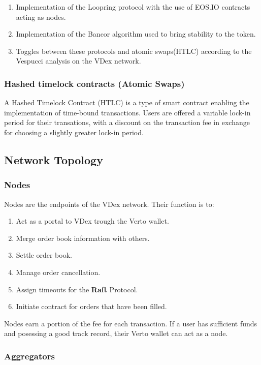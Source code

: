 \documentclass[]{article}
\begin{document}
{  
	\begin{enumerate} 
		\item Implementation of the Loopring protocol with the use of EOS.IO contracts acting as nodes.\cite{7}
		\item Implementation of the Bancor algorithm used to bring stability to the token.\cite{10}
		\item Toggles between these protocols and atomic swaps(HTLC) according to the Vespucci analysis on the VDex network.
		\end{enumerate}
	
	\subsubsection{Hashed timelock contracts (Atomic Swaps)}
	A Hashed Timelock Contract (HTLC)\cite{22} is a type of smart contract enabling the implementation of time-bound transactions.
	Users are offered a variable lock-in period for their transations, 
	with a discount on the transaction fee in exchange for choosing a slightly greater lock-in period.
	
	\subsection{Network Topology}
	\subsubsection{Nodes}
	Nodes are the endpoints of the VDex network.
	Their function is to:\
	\begin{enumerate}
		\item Act as a portal to VDex trough the Verto wallet.
		\item Merge order book information with others.
		\item Settle order book.\
		\item Manage order cancellation.\
		\item Assign timeouts for the \textbf{Raft} Protocol.\
		\item Initiate contract for orders that have been filled.
	\end{enumerate}

Nodes earn a portion of the fee for each transaction.
If a user has sufficient funds and posessing a good track record, their Verto wallet can act as a node.
	
	\subsubsection{Aggregators}
	
}
\end{document}
